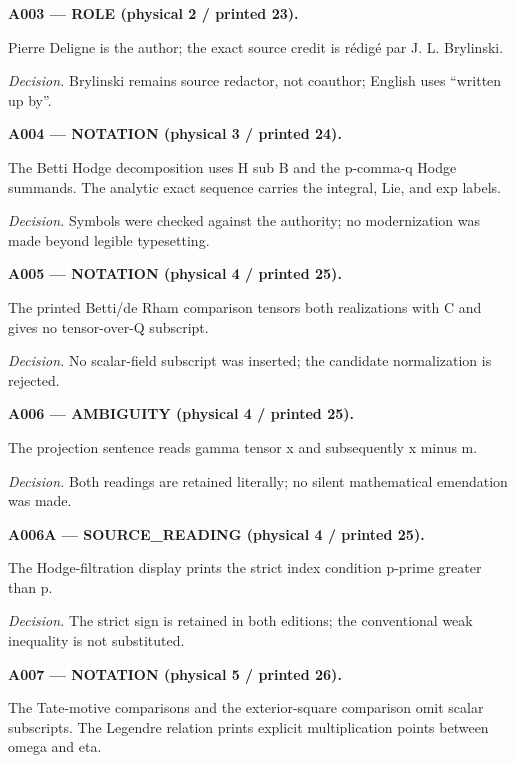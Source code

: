 \documentclass[10pt,a4paper]{article}
\begin{document}
\medskip

\noindent\textbf{A003 --- ROLE (physical 2 / printed 23).}

Pierre Deligne is the author; the exact source credit is rédigé par J. L. Brylinski.

\par\textit{Decision.} Brylinski remains source redactor, not coauthor; English uses ``written up by''.

\medskip

\noindent\textbf{A004 --- NOTATION (physical 3 / printed 24).}

The Betti Hodge decomposition uses H sub B and the p-comma-q Hodge summands. The analytic exact sequence carries the integral, Lie, and exp labels.

\par\textit{Decision.} Symbols were checked against the authority; no modernization was made beyond legible typesetting.

\medskip

\noindent\textbf{A005 --- NOTATION (physical 4 / printed 25).}

The printed Betti/de Rham comparison tensors both realizations with C and gives no tensor-over-Q subscript.

\par\textit{Decision.} No scalar-field subscript was inserted; the candidate normalization is rejected.

\medskip

\noindent\textbf{A006 --- AMBIGUITY (physical 4 / printed 25).}

The projection sentence reads gamma tensor x and subsequently x minus m.

\par\textit{Decision.} Both readings are retained literally; no silent mathematical emendation was made.

\medskip

\noindent\textbf{A006A --- SOURCE\_READING (physical 4 / printed 25).}

The Hodge-filtration display prints the strict index condition p-prime greater than p.

\par\textit{Decision.} The strict sign is retained in both editions; the conventional weak inequality is not substituted.

\medskip

\noindent\textbf{A007 --- NOTATION (physical 5 / printed 26).}

The Tate-motive comparisons and the exterior-square comparison omit scalar subscripts. The Legendre relation prints explicit multiplication points between omega and eta.
\end{document}

